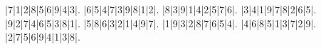 \begin{sudoku}
|7|1|2|8|5|6|9|4|3|.
|6|5|4|7|3|9|8|1|2|.
|8|3|9|1|4|2|5|7|6|.
|3|4|1|9|7|8|2|6|5|.
|9|2|7|4|6|5|3|8|1|.
|5|8|6|3|2|1|4|9|7|.
|1|9|3|2|8|7|6|5|4|.
|4|6|8|5|1|3|7|2|9|.
|2|7|5|6|9|4|1|3|8|.
\end{sudoku}